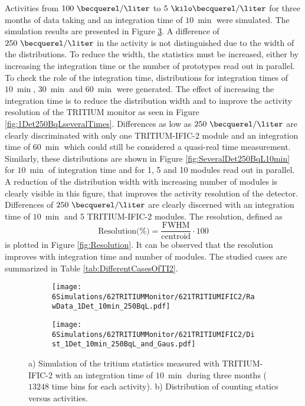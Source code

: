 Activities from $100~\becquerel/\liter$ to $5~\kilo\becquerel/\liter$ for three months of data taking and an integration time of $10~\min$ were simulated. The simulation results are presented in Figure \ref{fig:1Det10Min250BqL}. A difference of $250~\becquerel/\liter$ in the activity is not distinguished due to the width of the distributions. To reduce the width, the statistics must be increased, either by increasing the integration time or the number of prototypes read out in parallel. To check the role of the integration time, distributions for integration times of $10~\min$, $30~\min$ and $60~\min$ were generated. The effect of increasing the integration time is to reduce the distribution width and to improve the activity resolution of the TRITIUM monitor as seen in Figure \ref{fig:1Det250BqLseveralTimes}. Differences as low as $250~\becquerel/\liter$ are clearly discriminated with only one TRITIUM-IFIC-2 module and an integration time of $60~\min$ which could still be considered a quasi-real time measurement. Similarly, these distributions are shown in Figure \ref{fig:SeveralDet250BqL10min} for $10~\min$ of integration time and for 1, 5 and 10 modules read out in parallel. A reduction of the distribution width with increasing number of modules is clearly visible in this figure, that improves the activity resolution of the detector. Differences of $250~\becquerel/\liter$ are clearly discerned with an integration time of $10~\min$ and 5 TRITIUM-IFIC-2 modules. The resolution, defined as
\begin{equation}
\text{Resolution(\%)}=\frac{\text{FWHM}}{\text{centroid}}\cdot{}100
\label{eq:Resolution}
\end{equation}
is plotted in Figure \ref{fig:Resolution}. It can be observed that the resolution improves with integration time and number of modules. The studied cases are summarized in Table \ref{tab:DifferentCasesOfTI2}.

\begin{figure}
\centering
    \begin{subfigure}[b]{0.7\textwidth}
    \centering
    \texttt{[image: 6Simulations/62TRITIUMMonitor/621TRITIUMIFIC2/RawData\_1Det\_10min\_250BqL.pdf]}  
    \caption{\label{subfig:RawData1Det10Min250BqL}}
    \end{subfigure}
    \hfill
    \begin{subfigure}[b]{0.7\textwidth}
    \centering
    \texttt{[image: 6Simulations/62TRITIUMMonitor/621TRITIUMIFIC2/Dist\_1Det\_10min\_250BqL\_and\_Gaus.pdf]}  
    \caption{\label{subfig:Dist1Det10Min250BqL}}
    \end{subfigure}
 \caption{a) Simulation of the tritium statistics measured with TRITIUM-IFIC-2 with an integration time of $10~\min$ during three months ($13248$ time bins for each activity). b) Distribution of counting statics versus activities.}
 \label{fig:1Det10Min250BqL}
\end{figure}


